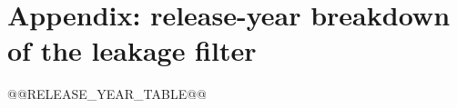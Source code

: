 \documentclass[10pt]{article}
\begin{document}
\appendix
\section*{Appendix: release-year breakdown of the leakage filter}

\renewcommand{\thetable}{S2}
\begin{table}[h]
\centering
\small
@@RELEASE_YEAR_TABLE@@
\caption{Non-redundant representatives by PDB release
year: total, number below the @@SEQ_IDENTITY_CUTOFF@@ identity leakage
threshold, percentage flagged as leakage, and number in the final
@@N_LABELED@@-chain primary benchmark set.}
\label{tab:releaseyear}
\end{table}
\end{document}
